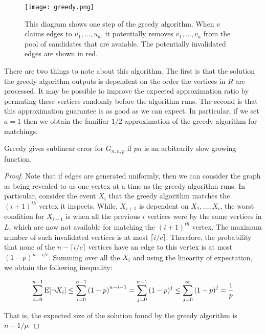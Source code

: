 \begin{figure}[h]
\centering
\texttt{[image: greedy.png]}
\begin{minipage}[h]{.8\linewidth}
\caption{This diagram shows one step of the greedy algorithm. When $v$ claims edges to $u_1,\ldots, u_a$, it potentially removes $v_1,\ldots, v_a$ from the pool of candidates that are avaiable. The potentially invalidated edges are shown in red.}
\end{minipage}
\end{figure}

There are two things to note about this algorithm. The first is
that the solution the greedy algorithm outputs is dependent on the
order the vertices in $R$ are processed. It may be possible to improve
the expected approximation ratio by permuting these vertices randomly
before the algorithm runs. The second is that this approximation
guarantee is as good as we can expect. In particular, if we set $a=1$
then we obtain the familiar $1/2$-approximation of the greedy algorithm for matchings.




\begin{thm}
Greedy gives sublinear error for $G_{n,n,p}$ if $pn$ is an arbitrarily slow growing function.
\end{thm}
\begin{proof}
Note that if edges are generated uniformly, then we can consider the
graph as being revealed to us one vertex at a time as the greedy
algorithm runs. In particular, consider the event $X_i$ that the
greedy algorithm matches the $(i+1)^{th}$ vertex it inspects. While,
$X_{i+1}$ is dependent on $X_1,\ldots, X_i$, the worst condition for
$X_{i+1}$ is when all the previous $i$ vertices were by the same
vertices in $L$, which are now not available for matching the
$(i+1)^{th}$ vertex. The maximum number of such invalidated vertices
is at most $\lceil i/c \rceil$. Therefore, the probability that none
of the $n-\lceil i/c \rceil $ vertices have an edge to this vertex is
at most $(1-p)^{n-i/c}$. Summing over all the $X_i$ and using the
linearity of expectation, we obtain the following inequality:

\[
\sum_{i=0}^{n-1} \text{E}[\lnot X_i] \leq \sum_{i=0}^{n-1} \left(1-p\right)^{n- i-1} = \sum_{j=0}^{n-1} \left(1-p\right)^j \leq\sum_{j=0}^{\infty} \left(1-p\right)^j = \frac{1}{p}
\]

That is, the expected size of the solution found by the greedy algorithm is $n-1/p$.
\end{proof} 